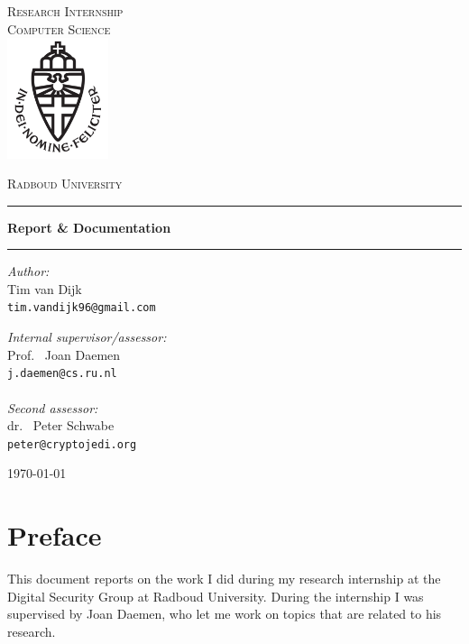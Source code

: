\documentclass{report}
\begin{document}
\begin{titlepage}
\begin{center}
\textsc{\LARGE Research Internship\\Computer Science}\\[1.5cm]
\includegraphics[height=100pt]{imgs/logo}

\vspace{0.4cm}
\textsc{\Large Radboud University}\\[1cm]
\hrule
\vspace{0.4cm}
\textbf{\huge Report \& Documentation
}\\[0.4cm]
\hrule
\vspace{2cm}
\begin{minipage}[t]{0.45\textwidth}
\begin{flushleft} \large
\textit{Author:}\\
Tim van Dijk\\
\texttt{tim.vandijk96@gmail.com}
\end{flushleft}
\end{minipage}
\begin{minipage}[t]{0.45\textwidth}
\begin{flushright} \large
\textit{Internal supervisor/assessor:}\\
Prof. \, Joan Daemen\\
\texttt{j.daemen@cs.ru.nl}\\[1.3cm]
\texttt{}\\[1.3cm]
\textit{Second assessor:}\\
dr. \, Peter Schwabe\\
\texttt{peter@cryptojedi.org}
\end{flushright}
\end{minipage}
\vfill
{\large \today}
\end{center}
\end{titlepage}

\tableofcontents
\chapter*{Preface}
This document reports on the work I did during my research internship at the Digital Security Group at Radboud University. During the internship I was supervised by Joan Daemen, who let me work on topics that are related to his research.
\end{document}
